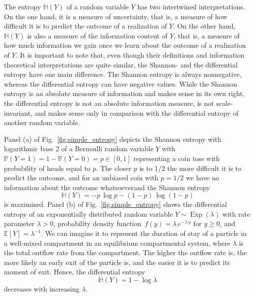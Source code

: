 \documentclass[smallextended]{svjour3}
\renewcommand{\P}{\mathbb{P}}
\newcommand{\E}{\mathbb{E}}
\renewcommand{\H}{\mathbb{H}}
\newcommand{\Exp}{\operatorname{Exp}}
\newcommand{\ie}{that is}
\newcommand{\pdf}{probability density function}
\providecommand{\DIFaddtex}[1]{{\protect\color{blue}\uwave{#1}}} %
\providecommand{\DIFaddbegin}{} %
\providecommand{\DIFaddend}{} %
\providecommand{\DIFadd}[1]{\texorpdfstring{\DIFaddtex{#1}}{#1}} %
\newcommand{\DIFaddincludegraphics}[2][]{{\color{blue}\fbox{\DIFOincludegraphics[#1]{#2}}}} %
\DeclareRobustCommand{\DIFaddbegin}{\DIFOaddbegin \let\includegraphics\DIFaddincludegraphics} %
\DeclareRobustCommand{\DIFaddend}{\DIFOaddend \let\includegraphics\DIFOincludegraphics} %
\begin{document}
The entropy $\H(Y)$ of a random variable $Y$ has two intertwined interpretations.
On the one hand, it is a measure of uncertainty, \ie, a measure of how difficult it is to predict the outcome of a realization of $Y$.
On the other hand, $\H(Y)$ is also a measure of the information content of $Y$, \ie, a measure of how much information we gain once we learn about the outcome of a realization of $Y$.
It is important to note that, even though their definitions and information theoretical interpretations are quite similar, the Shannon- and the differential entropy have one main difference.
The Shannon entropy is always nonnegative, whereas the differential entropy can have negative values.
While the Shannon entropy is an absolute measure of information and makes sense in its own right, the differential entropy is not an absolute information measure, is not scale-invariant, and makes sense only in comparison with the differential entropy of another random variable.

Panel (a) of Fig.~\ref{fig:simple_entropy} depicts the Shannon entropy with logarithmic base $2$ of a Bernoulli random variable $Y$ with $\P(Y=1)=1-\P(Y=0)=p\in[0,1]$ representing a coin toss with probability of heads equal to $p$.
The closer $p$ is to $1/2$ the more difficult it is to predict the outcome, and for an unbiased coin with $p=1/2$ we have no information about the outcome whatsoever\DIFaddbegin \DIFadd{, }\DIFaddend and the Shannon entropy
\begin{equation}
	\H(Y) = -p\,\log p - (1-p)\,\log(1-p)
\end{equation}
is maximized.
Panel (b) of Fig.~\ref{fig:simple_entropy} shows the differential entropy of an exponentially distributed random variable $Y\sim\Exp(\lambda)$ with rate parameter $\lambda>0$, \pdf\ $f(y) = \lambda\,e^{-\lambda\,y}$ for $y\geq0$, and $\E\left[Y\right]=\lambda^{-1}$.
We can imagine it to represent the duration of stay of a particle in a well-mixed compartment in an equilibrium compartmental system, where $\lambda$ is the total outflow rate from the compartment.
The higher the outflow rate is, the more likely an early exit of the particle is, and the easier it is to predict its moment of exit.
Hence, the differential entropy 
\begin{equation}
	\H(Y) = 1-\log\lambda
\end{equation}
decreases with increasing $\lambda$.
\end{document}
